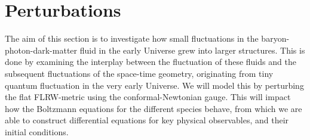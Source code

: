 \section{Perturbations}\label{sec:m3}

The aim of this section is to investigate how small fluctuations in the baryon-photon-dark-matter fluid in the early Universe grew into larger structures. This is done by examining the interplay between the fluctuation of these fluids and the subsequent fluctuations of the space-time geometry, originating from tiny quantum fluctuation in the very early Universe. We will model this by perturbing the flat FLRW-metric using the conformal-Newtonian gauge. This will impact how the Boltzmann equations for the different species behave, from which we are able to construct differential equations for key physical observables, and their initial conditions. 



